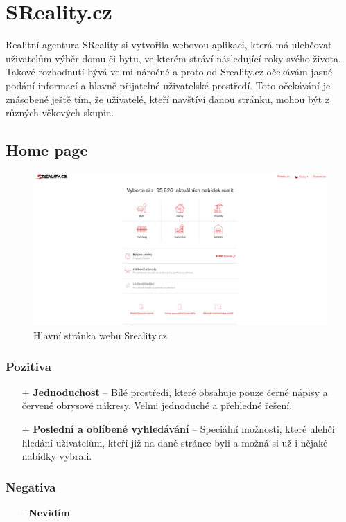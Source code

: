 \section{SReality.cz}
\label{analyza:sreality}
Realitní agentura SReality si vytvořila webovou aplikaci, která má ulehčovat uživatelům výběr domu či bytu, ve kterém stráví následující roky svého života. Takové rozhodnutí bývá velmi náročné a proto od Sreality.cz očekávám jasné podání informací a hlavně přijatelné uživatelské prostředí. Toto očekávání je znásobené ještě tím, že uživatelé, kteří navštíví danou stránku, mohou být z různých věkových skupin.\\

\subsection{Home page}
\begin{figure}[h]
    \centering
    \includegraphics[width=1.0\textwidth]{media/sreality/homepage.png}
    \caption{Hlavní stránka webu Sreality.cz}
    \label{fig:sreality:homepage}
\end{figure}
\subsubsection*{Pozitiva}
\begin{itemize}
    \item[+] \textbf{Jednoduchost} -- Bílé prostředí, které obsahuje pouze černé nápisy a červené obrysové nákresy. Velmi jednoduché a přehledné řešení.
    \item[+] \textbf{Poslední a oblíbené vyhledávání} -- Speciální možnosti, které ulehčí hledání uživatelům, kteří již na dané stránce byli a možná si už i nějaké nabídky vybrali.
\end{itemize}
\subsubsection*{Negativa}
\begin{itemize}
    \item[-] \textbf{Nevidím}
\end{itemize}


